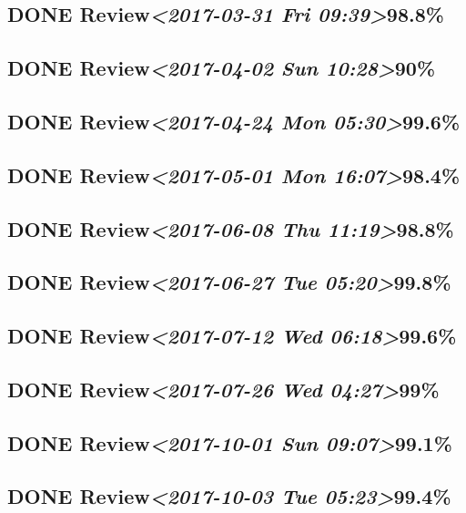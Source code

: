 \documentclass[11pt]{ctexart}
\begin{document}
\subsection{{\bfseries\sffamily DONE} Review\textit{<2017-03-31 Fri 09:39>}98.8\%}
\label{sec:orgf51e043}
\subsection{{\bfseries\sffamily DONE} Review\textit{<2017-04-02 Sun 10:28>}90\%}
\label{sec:org55dd3f8}
\subsection{{\bfseries\sffamily DONE} Review\textit{<2017-04-24 Mon 05:30>}99.6\%}
\label{sec:org2375033}
\subsection{{\bfseries\sffamily DONE} Review\textit{<2017-05-01 Mon 16:07>}98.4\%}
\label{sec:orga4070f5}
\subsection{{\bfseries\sffamily DONE} Review\textit{<2017-06-08 Thu 11:19>}98.8\%}
\label{sec:org79050e8}
\subsection{{\bfseries\sffamily DONE} Review\textit{<2017-06-27 Tue 05:20>}99.8\%}
\label{sec:org1ea0cdb}
\subsection{{\bfseries\sffamily DONE} Review\textit{<2017-07-12 Wed 06:18>}99.6\%}
\label{sec:orgd41879f}
\subsection{{\bfseries\sffamily DONE} Review\textit{<2017-07-26 Wed 04:27>}99\%}
\label{sec:org211e7e4}
\subsection{{\bfseries\sffamily DONE} Review\textit{<2017-10-01 Sun 09:07>}99.1\%}
\label{sec:orgbe47753}
\subsection{{\bfseries\sffamily DONE} Review\textit{<2017-10-03 Tue 05:23>}99.4\%}
\label{sec:orgd73cd36}
\end{document}
